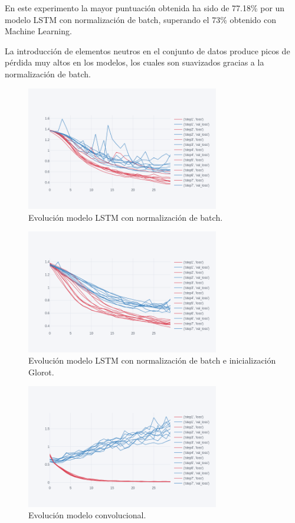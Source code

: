 En este experimento la mayor puntuación obtenida ha sido de 77.18\% por un modelo LSTM con normalización de batch, superando el 73\% obtenido con Machine Learning. 

La introducción de elementos neutros en el conjunto de datos produce picos de pérdida muy altos en los modelos, los cuales son suavizados gracias a la normalización de batch.

\begin{figure}[H]
	\centering
	\includegraphics[width=0.75\textwidth]{imaxes/bn-3.png}
	\caption{Evolución modelo LSTM con normalización de batch.}
	\label{bn-3}
\end{figure}

\begin{figure}[H]
	\centering
	\includegraphics[width=0.75\textwidth]{imaxes/gn-3.png}
	\caption{Evolución modelo LSTM con normalización de batch e inicialización Glorot.}
	\label{gn-3}
\end{figure}

\begin{figure}[H]
	\centering
	\includegraphics[width=0.75\textwidth]{imaxes/conv-3.png}
	\caption{Evolución modelo convolucional.}
	\label{conv-3}
\end{figure}

